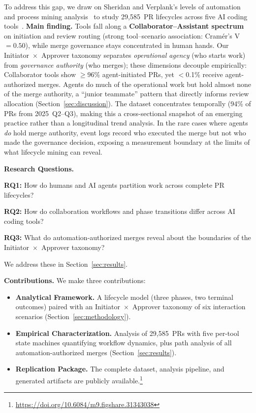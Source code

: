 \documentclass[sigconf]{acmart}
\newcommand{\CompactListSpacing}{%
  \setlength{\itemsep}{1pt plus 0.5pt minus 0.5pt}%
  \setlength{\parsep}{0pt}%
  \setlength{\topsep}{4pt plus 1pt minus 1pt}%
  \setlength{\partopsep}{0pt}%
}
\begin{document}
To address this gap, we draw on Sheridan and Verplank's levels of
automation~\cite{sheridan1978human} and process mining
analysis~\cite{vanderaalst2016process} to study 29,585~PR
lifecycles across five AI coding
tools~\cite{li2025aidev}.
\textbf{Main finding.}
Tools fall along a \textbf{Collaborator--Assistant spectrum} on
initiation and review routing (strong tool--scenario association:
Cram\'er's V~$= 0.50$), while merge governance stays concentrated in
human hands.
Our Initiator~$\times$~Approver taxonomy separates \emph{operational
agency} (who starts work) from \emph{governance authority} (who
merges); these dimensions decouple empirically: Collaborator tools
show $\geq$96\% agent-initiated PRs, yet $<$0.1\% receive
agent-authorized merges.
Agents do much of the operational work but hold almost none of the
merge authority, a ``junior teammate'' pattern that directly informs
review allocation (Section~\ref{sec:discussion}).
The dataset concentrates temporally (94\% of PRs from
2025~Q2--Q3), making this a cross-sectional snapshot of an
emerging practice rather than a longitudinal trend analysis.
In the rare cases where agents \emph{do} hold merge authority,
event logs record who executed the merge but not who made the
governance decision, exposing a measurement boundary at the limits
of what lifecycle mining can reveal.

\textbf{Research Questions.}

\textbf{RQ1:} How do humans and AI agents partition work across
complete PR lifecycles?

\textbf{RQ2:} How do collaboration workflows and phase transitions
differ across AI coding tools?

\textbf{RQ3:} What do automation-authorized merges reveal about
the boundaries of the Initiator~$\times$~Approver taxonomy?

We address these in Section~\ref{sec:results}.

\textbf{Contributions.} We make three contributions:
\begin{itemize}\CompactListSpacing
    \item \textbf{Analytical Framework.} A lifecycle model (three
    phases, two terminal outcomes) paired with an
    Initiator~$\times$~Approver taxonomy of six interaction scenarios
    (Section~\ref{sec:methodology}).
    \item \textbf{Empirical Characterization.} Analysis of 29,585~PRs
    with five per-tool state machines quantifying workflow dynamics,
    plus path analysis of all automation-authorized merges
    (Section~\ref{sec:results}).
    \item \textbf{Replication Package.} The complete dataset,
    analysis pipeline, and generated artifacts are publicly
    available.\footnote{\url{https://doi.org/10.6084/m9.figshare.31343038}}
\end{itemize}
\end{document}
